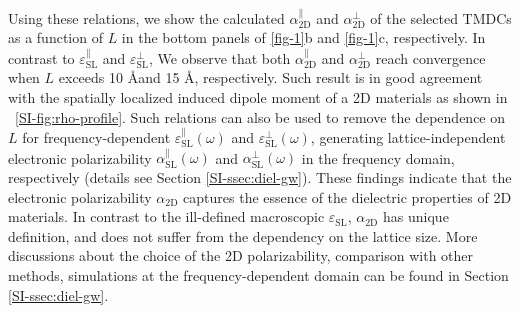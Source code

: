 %
%
Using these relations, we show the calculated
$\alpha_{\mathrm{2D}}^{\parallel}$ and $\alpha_{\mathrm{2D}}^{\perp}$
of the selected TMDCs as a function of $L$ in the bottom panels of
 \autoref{fig-1}b and \autoref{fig-1}c, respectively.  In contrast to
$\varepsilon_{\mathrm{SL}}^{\parallel}$ and
$\varepsilon_{\mathrm{SL}}^{\perp}$, We observe that both
$\alpha_{\mathrm{2D}}^{\parallel}$ and $\alpha_{\mathrm{2D}}^{\perp}$
reach convergence when $L$ exceeds 10 \AA and 15 \AA,
respectively. Such result is in good agreement with the spatially
localized induced dipole moment of a 2D materials as shown in
 ~\autoref{SI-fig:rho-profile}.
%
%
Such relations can also be used to remove the dependence on $L$ for
frequency-dependent $\varepsilon^{\parallel}_{\mathrm{SL}}(\omega)$
and $\varepsilon^{\perp}_{\mathrm{SL}}(\omega)$, generating
lattice-independent electronic polarizability
$\alpha^{\parallel}_{\mathrm{SL}}(\omega)$ and
$\alpha^{\perp}_{\mathrm{SL}}(\omega)$ in the frequency domain,
respectively (details see  Section \autoref{SI-ssec:diel-gw}).
%
% 
% 
% 
% 
These findings indicate that the electronic polarizability $\alpha_{\mathrm{2D}}$ captures the essence
of the dielectric properties of 2D materials. In contrast to the ill-defined macroscopic $\varepsilon_{\mathrm{SL}}$, $\alpha_{\mathrm{2D}}$ has unique definition, and does not suffer from the dependency on the lattice size.
More discussions about the choice of the
2D polarizability, comparison with other methods, simulations at the
frequency-dependent domain can be found in  Section
\autoref{SI-ssec:diel-gw}.

